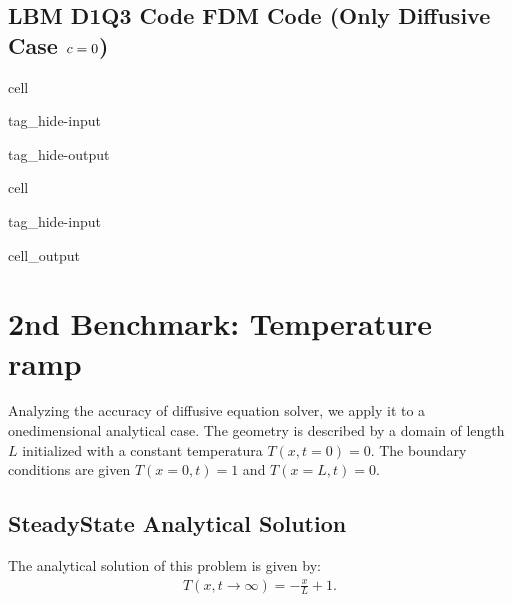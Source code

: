 \documentclass[letterpaper,10pt,english,openany,oneside]{jupyterBook}
\begin{document}
\subsection{LBM D1Q3 Code \sphinxhyphen{} FDM Code (Only Diffusive Case \protect\(c=0\protect\))}
\label{\detokenize{Refs/LBM-Study/FDM-Belloti/FDM-LBM-Diffusive:lbm-d1q3-code-fdm-code-only-diffusive-case-c-0}}
\begin{sphinxuseclass}{cell}
\begin{sphinxuseclass}{tag_hide-input}
\begin{sphinxuseclass}{tag_hide-output}
\end{sphinxuseclass}
\end{sphinxuseclass}
\end{sphinxuseclass}
\begin{sphinxuseclass}{cell}
\begin{sphinxuseclass}{tag_hide-input}\begin{sphinxVerbatimOutput}

\begin{sphinxuseclass}{cell_output}
\noindent{}

\end{sphinxuseclass}\end{sphinxVerbatimOutput}

\end{sphinxuseclass}
\end{sphinxuseclass}

\section{2nd Benchmark: Temperature ramp}
\label{\detokenize{Refs/LBM-Study/FDM-Belloti/FDM-LBM-Diffusive:nd-benchmark-temperature-ramp}}
\sphinxAtStartPar
Analyzing the accuracy of diffusive equation solver, we apply it to a one\sphinxhyphen{}dimensional analytical case. The geometry is described by a domain of length \(L\) initialized with a constant temperatura \(T(x,t=0)=0\). The boundary conditions are given \(T(x=0,t)=1\) and \(T(x=L,t)=0\).


\subsection{Steady\sphinxhyphen{}State Analytical Solution}
\label{\detokenize{Refs/LBM-Study/FDM-Belloti/FDM-LBM-Diffusive:steady-state-analytical-solution}}
\sphinxAtStartPar
The analytical solution of this problem is given by:
\begin{equation*}
\begin{split}
T(x,t\rightarrow \infty)= -\frac{x}{L} + 1.
\end{split}
\end{equation*}
\end{document}
